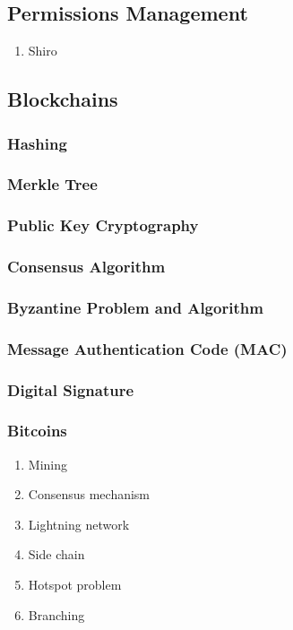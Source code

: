 \documentclass[11pt, twocolumn]{article}
\begin{document}
\subsection{Permissions Management}
\begin{enumerate}
	\item Shiro
\end{enumerate}

\subsection{Blockchains}

\subsubsection{Hashing}

\subsubsection{Merkle Tree}

\subsubsection{Public Key Cryptography}

\subsubsection{Consensus Algorithm}

\subsubsection{Byzantine Problem and Algorithm}

\subsubsection{Message Authentication Code (MAC)}

\subsubsection{Digital Signature}

\subsubsection{Bitcoins}
\begin{enumerate}
	\item Mining
	\item Consensus mechanism
	\item Lightning network
	\item Side chain
	\item Hotspot problem
	\item Branching
\end{enumerate}
\end{document}
